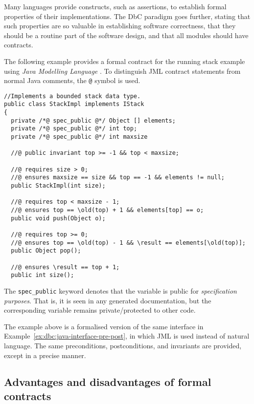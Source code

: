 Many languages provide constructs, such as assertions, to establish formal properties of their implementations. The DbC paradigm goes further, stating that such properties are so valuable in establishing software correctness, that they should be a routine part of the software design, and that all modules should have contracts.

\begin{example}
The following example provides a formal contract for the running stack example using  \emph{Java Modelling Language} \cite{leavens99}. To distinguish JML contract statements from normal Java comments, the \texttt{@} symbol is used.

\lstset{language=Java}
\lstset{aboveskip=3mm}
\begin{lstlisting}
//Implements a bounded stack data type.
public class StackImpl implements IStack
{
  private /*@ spec_public @*/ Object [] elements;
  private /*@ spec_public @*/ int top;
  private /*@ spec_public @*/ int maxsize

  //@ public invariant top >= -1 && top < maxsize;

  //@ requires size > 0;
  //@ ensures maxsize == size && top == -1 && elements != null;
  public StackImpl(int size);

  //@ requires top < maxsize - 1;
  //@ ensures top == \old(top) + 1 && elements[top] == o;
  public void push(Object o);

  //@ requires top >= 0;
  //@ ensures top == \old(top) - 1 && \result == elements[\old(top)];
  public Object pop();

  //@ ensures \result == top + 1;
  public int size();
\end{lstlisting}

The \texttt{spec\_public} keyword denotes that the variable is public for \emph{specification purposes}. That is, it is seen in any generated documentation, but the corresponding variable remains private/protected to other code.

\end{example}

The example above is a formalised version of the same interface in Example~\ref{ex:dbc:java-interface-pre-post}, in which JML is used instead of natural language. The same preconditions, postconditions, and invariants are provided, except in a precise manner.

\subsection{Advantages and disadvantages of formal contracts}

